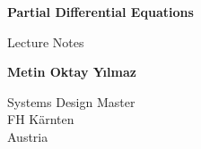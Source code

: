 \begin{titlepage}
	\begin{center}
		\vspace*{1cm}

		\textbf{\Large Partial Differential Equations}

		\vspace{0.5cm}
		\large Lecture Notes

		\vspace{1.5cm}

		\textbf{Metin Oktay Yılmaz}

		\vfill

		\vspace{0.8cm}


		Systems Design Master\\
		FH K\"arnten\\
		Austria\\
	\end{center}
\end{titlepage}